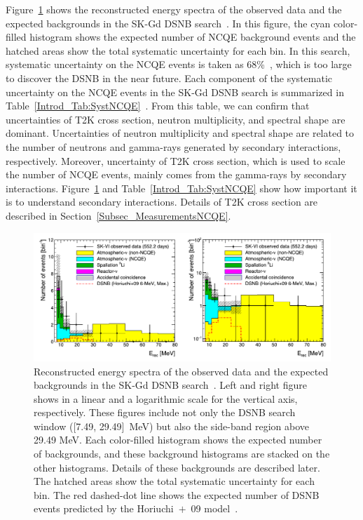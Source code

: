 \hs
Figure~\ref{Harada_DSNB} shows the reconstructed energy spectra of the observed data and the expected backgrounds in the SK-Gd DSNB search~\cite{2023Harada}.
In this figure, the cyan color-filled histogram shows the expected number of NCQE background events and the hatched areas show the total systematic uncertainty for each bin.
In this search, systematic uncertainty on the NCQE events is taken as 68\%~\cite{2023HaradaPhD}, which is too large to discover the DSNB in the near future.
Each component of the systematic uncertainty on the NCQE events in the SK-Gd DSNB search is summarized in Table~\ref{Introd_Tab:SystNCQE}~\cite{2023HaradaPhD}.
From this table, we can confirm that uncertainties of T2K cross section, neutron multiplicity, and spectral shape are dominant.
Uncertainties of neutron multiplicity and spectral shape are related to the number of neutrons and gamma-rays generated by secondary interactions, respectively.
Moreover, uncertainty of T2K cross section, which is used to scale the number of NCQE events, mainly comes from the gamma-rays by secondary interactions.
Figure~\ref{Harada_DSNB} and Table~\ref{Introd_Tab:SystNCQE} show how important it is to understand secondary interactions.
Details of T2K cross section are described in Section~\ref{Subsec_MeasurementsNCQE}.

\begin{figure}[h]
	\centering
	\includegraphics[width=14cm]{Figures/Introduction/Harada_DSNB}
	\caption[Reconstructed energy spectra of the observed data and the expected backgrounds in the SK-Gd DSNB search]{
	Reconstructed energy spectra of the observed data and the expected backgrounds in the SK-Gd DSNB search~\cite{2023Harada}.
	Left and right figure shows in a linear and a logarithmic scale for the vertical axis, respectively.
	These figures include not only the DSNB search window ([7.49, 29.49]~MeV) but also the side-band region above 29.49 MeV.
	Each color-filled histogram shows the expected number of backgrounds, and these background histograms are stacked on the other histograms.
	Details of these backgrounds are described later.
	The hatched areas show the total systematic uncertainty for each bin.
	The red dashed-dot line shows the expected number of DSNB events predicted by the Horiuchi~$+$~09 model~\cite{2009Horiuchi}.
	}\label{Harada_DSNB}
\end{figure}

